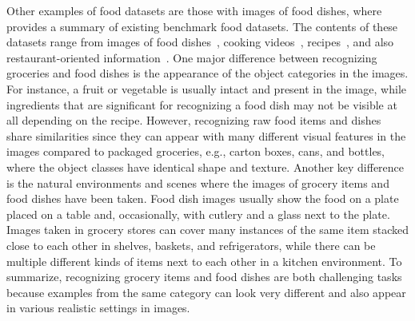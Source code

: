 Other examples of food datasets are those with images of food dishes, where  provides a summary of existing benchmark food datasets. The contents of these datasets range from images of food dishes~, cooking videos~, recipes~, and also restaurant-oriented information~. One major difference between recognizing groceries and food dishes is the appearance of the object categories in the images. For instance, a fruit or vegetable is usually intact and present in the image, while ingredients that are significant for recognizing a food dish may not be visible at all depending on the recipe. However, recognizing raw food items and dishes share similarities since they can appear with many different visual features in the images compared to packaged groceries, e.g., carton boxes, cans, and bottles, where the object classes have identical shape and texture. 
Another key difference is the natural environments and scenes where the images of grocery items and food dishes have been taken. Food dish images usually show the food on a plate placed on a table and, occasionally, with cutlery and a glass next to the plate. Images taken in grocery stores can cover many instances of the same item stacked close to each other in shelves, baskets, and refrigerators, while there can be multiple different kinds of items next to each other in a kitchen environment. 
To summarize, recognizing grocery items and food dishes are both challenging tasks because examples from the same category can look very different and also appear in various realistic settings in images.


